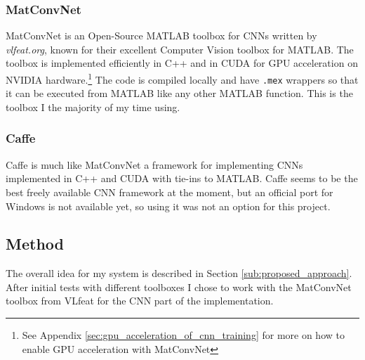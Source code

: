 \documentclass[Main]{subfiles}
\begin{document}
		\subsubsection{MatConvNet} %
			\label{ssub:matconvnet}
			MatConvNet \cite{Lenc2014} is an Open-Source MATLAB toolbox for CNNs written by \emph{vlfeat.org}, known for their excellent Computer Vision toolbox for MATLAB.
			The toolbox is implemented efficiently in C++ and in CUDA for GPU acceleration on NVIDIA hardware.\footnote{
				See Appendix \ref{sec:gpu_acceleration_of_cnn_training} for more on how to enable GPU acceleration with MatConvNet
				} 
			The code is compiled locally and have \texttt{.mex} wrappers so that it can be executed from MATLAB like any other MATLAB function.
			This is the toolbox I the majority of my time using.
		
		
		\subsubsection{Caffe} %
			\label{ssub:caffe}
			Caffe \cite{jia2014caffe} is much like MatConvNet a framework for implementing CNNs implemented in C++ and CUDA with tie-ins to MATLAB.
			Caffe seems to be the best freely available CNN framework at the moment, but an official port for Windows is not available yet, so using it was not an option for this project.



		\subsection{Method} %
			\label{sub:cnn_method}
			The overall idea for my system is described in Section \ref{sub:proposed_approach}.
			After initial tests with different toolboxes I chose to work with the MatConvNet toolbox from VLfeat for the CNN part of the implementation.
			
\end{document}
